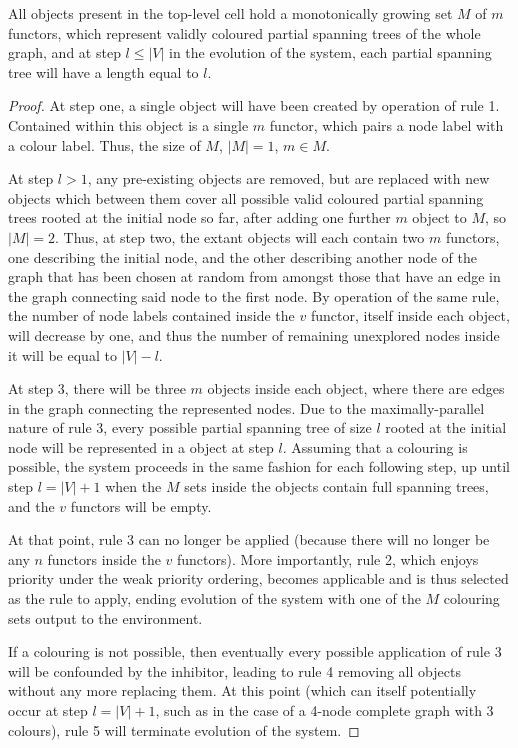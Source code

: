 \begin{proposition}\label{prop:gcol:grow}
All \bo{} objects present in the top-level cell hold a monotonically growing set \(M\) of \(m\) functors, which represent validly coloured partial spanning trees of the whole graph, and at step \(l \leq |V|\) in the evolution of the system, each partial spanning tree will have a length equal to \(l\).
\end{proposition}

\begin{proof}
At step one, a single \bo{} object will have been created by operation of rule 1.  Contained within this \bo{} object is a single \(m\) functor, which pairs a node label with a colour label.  Thus, the size of \(M\), \(|M|=1\), \(m \in M\).

At step \(l > 1\), any pre-existing \bo{} objects are removed, but are replaced with new \bo{} objects which between them cover all possible valid coloured partial spanning trees rooted at the initial node so far, after adding one further \(m\) object to \(M\), so \(|M|=2\).  Thus, at step two, the extant \bo{} objects will each contain two \(m\) functors, one describing the initial node, and the other describing another node of the graph that has been chosen at random from amongst those that have an edge in the graph connecting said node to the first node.  By operation of the same rule, the number of node labels contained inside the \(v\) functor, itself inside each \bo{} object, will decrease by one, and thus the number of remaining unexplored nodes inside it will be equal to \(|V| - l\).%

At step 3, there will be three \(m\) objects inside each \bo{} object, where there are edges in the graph connecting the represented nodes.  Due to the maximally-parallel nature of rule 3, every possible partial spanning tree of size \(l\) rooted at the initial node will be represented in a \bo{} object at step \(l\).  Assuming that a colouring is possible, the system proceeds in the same fashion for each following step, up until step \(l = |V| + 1\) when the \(M\) sets inside the \bo{} objects contain full spanning trees, and the \(v\) functors will be empty.

At that point, rule 3 can no longer be applied (because there will no longer be any \(n\) functors inside the \(v\) functors).  More importantly, rule 2, which enjoys priority under the weak priority ordering, becomes applicable and is thus selected as the rule to apply, ending evolution of the system with one of the \(M\) colouring sets output to the environment.

If a colouring is not possible, then eventually every possible application of rule 3 will be confounded by the inhibitor, leading to rule 4 removing all \bo{} objects without any more replacing them.  At this point (which can itself potentially occur at step \(l = |V| + 1\), such as in the case of a 4-node complete graph with 3 colours), rule 5 will terminate evolution of the system.
\end{proof}

